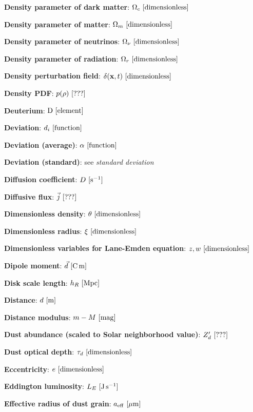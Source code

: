 \documentclass[a4paper,10pt]{article}
\begin{document}
{\noindent}\textbf{Density parameter of dark matter}: $\Omega_c ~ [{\rm dimensionless}]$

{\noindent}\textbf{Density parameter of matter}: $\Omega_m ~ [{\rm dimensionless}]$

{\noindent}\textbf{Density parameter of neutrinos}: $\Omega_\nu ~ [{\rm dimensionless}]$

{\noindent}\textbf{Density parameter of radiation}: $\Omega_r ~ [{\rm dimensionless}]$

{\noindent}\textbf{Density perturbation field}: $\delta(\mathbf{x},t) ~ [{\rm dimensionless}]$

{\noindent}\textbf{Density PDF}: $p(\rho) ~ [{\rm ???}]$

{\noindent}\textbf{Deuterium}: ${\rm D} ~ [{\rm element}]$

{\noindent}\textbf{Deviation}: $d_i ~ [{\rm function}]$

{\noindent}\textbf{Deviation (average)}: $\alpha ~ [{\rm function}]$

{\noindent}\textbf{Deviation (standard)}: see \textit{standard deviation}

{\noindent}\textbf{Diffusion coefficient}: $D ~ [{\rm s^{-1}}]$

{\noindent}\textbf{Diffusive flux}: $\vec{j} ~ [{\rm ???}]$

{\noindent}\textbf{Dimensionless density}: $\theta ~ [{\rm dimensionless}]$

{\noindent}\textbf{Dimensionless radius}: $\xi ~ [{\rm dimensionless}]$

{\noindent}\textbf{Dimensionless variables for Lane-Emden equation}: $z, w ~ [{\rm dimensionless}]$

{\noindent}\textbf{Dipole moment}: $\vec{d} ~ [{\rm C\,m}]$

{\noindent}\textbf{Disk scale length}: $h_R ~ [{\rm Mpc}]$

{\noindent}\textbf{Distance}: $d ~ [{\rm m}]$

{\noindent}\textbf{Distance modulus}: $m - M ~ [{\rm mag}]$

{\noindent}\textbf{Dust abundance (scaled to Solar neighborhood value)}: $Z_d' ~ [{\rm ???}]$

{\noindent}\textbf{Dust optical depth}: $\tau_d ~ [{\rm dimensionless}]$

{\noindent}\textbf{Eccentricity}: $e ~ [{\rm dimensionless}]$

{\noindent}\textbf{Eddington luminosity}: $L_E ~ [{\rm J\,s^{-1}}]$

{\noindent}\textbf{Effective radius of dust grain}: $a_{\rm eff} ~ [{\rm \mu m}]$
\end{document}
